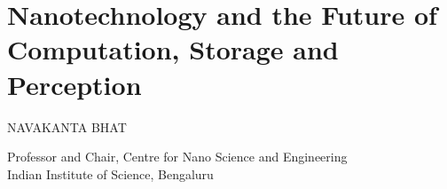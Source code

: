 \chapter{Nanotechnology and the Future of Computation, Storage and Perception}

\begin{center}
{\large\uppercase{Navakanta Bhat}}

\vskip -6pt

Professor and Chair, Centre for Nano Science and Engineering\\ Indian Institute of Science, Bengaluru
\end{center}

\vskip 1cm

\noindent{}

\newpage

